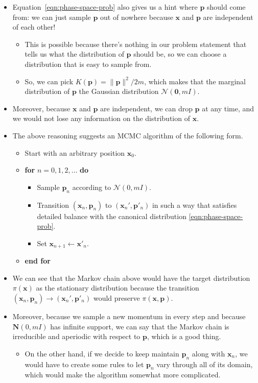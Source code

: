 \documentclass[10pt]{article}
\newcommand{\ve}[1]{\mathbf{#1}}
\newcommand{\mcal}[1]{\mathcal{#1}}
\begin{document}
\begin{itemize}
  \item Equation~\eqref{eqn:phase-space-prob} also gives us a hint where $\ve{p}$ should come from: we can just sample $\ve{p}$ out of nowhere because $\ve{x}$ and $\ve{p}$ are independent of each other!
  
  \begin{itemize}
    \item This is possible because there's nothing in our problem statement that tells us what the distribution of $\ve{p}$ should be, so we can choose a distribution that is easy to sample from.

    \item So, we can pick $K(\ve{p}) = \| \ve{p} \|^2/2m$, which makes that the marginal distribution of $\ve{p}$ the Gaussian distribution $\mcal{N}(\ve{0}, mI)$.
  \end{itemize}

  \item Moreover, because $\ve{x}$ and $\ve{p}$ are independent, we can drop $\ve{p}$ at any time, and we would not lose any information on the distribution of $\ve{x}$.
  
  \item The above reasoning suggests an MCMC algorithm of the following form.
  \begin{itemize}
    \item Start with an arbitrary position $\ve{x}_0$.
    \item {\bf for} $n = 0, 1, 2, \dotsc$ {\bf do}
    \begin{itemize}
      \item Sample $\ve{p}_n$ according to $\mcal{N}(0,mI)$.
      \item Transition $(\ve{x}_n,\ve{p}_n)$ to $(\ve{x}_n',\ve{p}'_n)$ in such a way that satisfies detailed balance with the canonical distribution \eqref{eqn:phase-space-prob}.
      \item Set $\ve{x}_{n+1} \gets \ve{x}'_n$.
    \end{itemize}
    \item[] {\bf end for}
  \end{itemize}

  \item We can see that the Markov chain above would have the target distribution $\pi(\ve{x})$ as the stationary distribution because the transition $(\ve{x}_n,\ve{p}_n) \rightarrow (\ve{x}_n',\ve{p}'_n)$ would preserve $\pi(\ve{x},\ve{p})$.
  
  \item Moreover, because we sample a new momentum in every step and because $\ve{N}(0,mI)$ has infinite support, we can say that the Markov chain is irreducible and aperiodic with respect to $\ve{p}$, which is a good thing.
  \begin{itemize}
    \item On the other hand, if we decide to keep maintain $\ve{p}_n$ along with $\ve{x}_n$, we would have to create some rules to let $\ve{p}_n$ vary through all of its domain, which would make the algorithm somewhat more complicated.
  \end{itemize}


\end{itemize}
\end{document}
